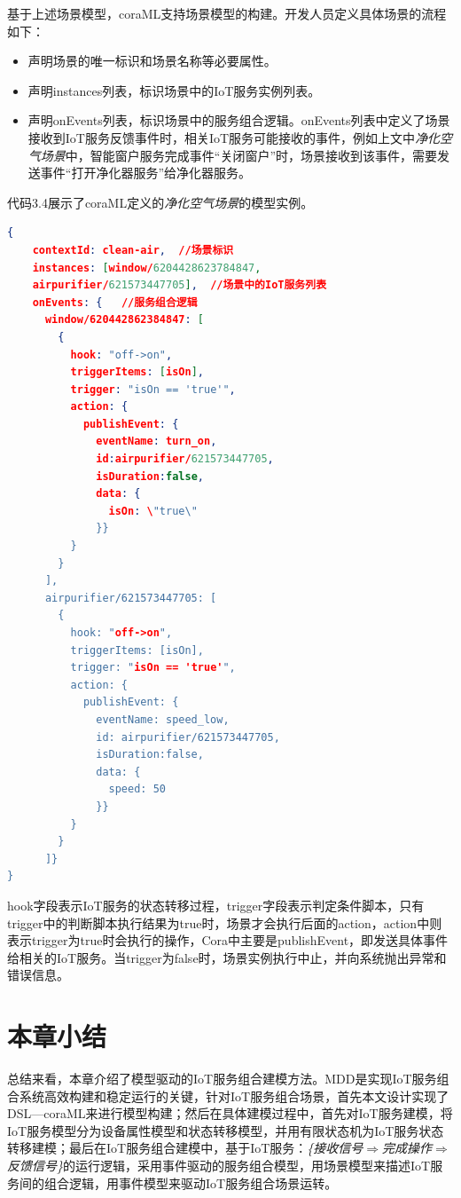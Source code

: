 \documentclass[winfonts,master,twoside]{njuthesis}
\begin{document}
基于上述场景模型，coraML支持场景模型的构建。开发人员定义具体场景的流程如下：
\begin{itemize}
    \item 声明场景的唯一标识和场景名称等必要属性。
    \item 声明instances列表，标识场景中的IoT服务实例列表。
    \item 声明onEvents列表，标识场景中的服务组合逻辑。onEvents列表中定义了场景接收到IoT服务反馈事件时，相关IoT服务可能接收的事件，例如上文中\textit{净化空气场景}中，智能窗户服务完成事件“关闭窗户”时，场景接收到该事件，需要发送事件“打开净化器服务”给净化器服务。
\end{itemize}
代码3.4展示了coraML定义的\textit{净化空气场景}的模型实例。
\begin{lstlisting}[caption={coraML定义的净化空气场景模型},label={lst:clean_air_model},language=json,basicstyle=\footnotesize] 
{
    contextId: clean-air,  //场景标识
    instances: [window/6204428623784847,
    airpurifier/621573447705],  //场景中的IoT服务列表
    onEvents: {   //服务组合逻辑
      window/620442862384847: [
        {
          hook: "off->on",     
          triggerItems: [isOn],
          trigger: "isOn == 'true'",
          action: {
            publishEvent: {
              eventName: turn_on,
              id:airpurifier/621573447705,
              isDuration:false,
              data: {
                isOn: \"true\"
              }}
          }
        }
      ],
      airpurifier/621573447705: [
        {
          hook: "off->on",
          triggerItems: [isOn],
          trigger: "isOn == 'true'",
          action: {
            publishEvent: {
              eventName: speed_low,
              id: airpurifier/621573447705,
              isDuration:false,
              data: {
                speed: 50
              }}
          }
        }
      ]}
}
\end{lstlisting}
hook字段表示IoT服务的状态转移过程，trigger字段表示判定条件脚本，只有trigger中的判断脚本执行结果为true时，场景才会执行后面的action，action中则表示trigger为true时会执行的操作，Cora中主要是publishEvent，即发送具体事件给相关的IoT服务。当trigger为false时，场景实例执行中止，并向系统抛出异常和错误信息。

\section{本章小结}
总结来看，本章介绍了模型驱动的IoT服务组合建模方法。MDD是实现IoT服务组合系统高效构建和稳定运行的关键，针对IoT服务组合场景，首先本文设计实现了DSL—coraML来进行模型构建；然后在具体建模过程中，首先对IoT服务建模，将IoT服务模型分为设备属性模型和状态转移模型，并用有限状态机为IoT服务状态转移建模；最后在IoT服务组合建模中，基于IoT服务：\textit{\{接收信号$\Rightarrow$完成操作$\Rightarrow$反馈信号\}}的运行逻辑，采用事件驱动的服务组合模型，用场景模型来描述IoT服务间的组合逻辑，用事件模型来驱动IoT服务组合场景运转。
\end{document}

